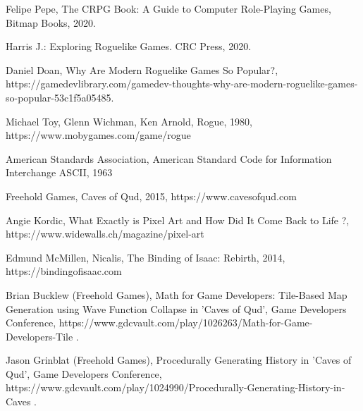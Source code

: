 \documentclass[12pt,twoside]{article}
\begin{document}

\begin{thebibliography}{4}
	

 Felipe Pepe, The CRPG Book: A Guide to Computer Role-Playing Games, Bitmap Books, 2020.

 Harris J.: Exploring Roguelike Games. CRC Press, 2020.

 Daniel Doan, Why Are Modern Roguelike Games So Popular?, https://gamedevlibrary.com/gamedev-thoughts-why-are-modern-roguelike-games-so-popular-53c1f5a05485.

 Michael Toy, Glenn Wichman, Ken Arnold, Rogue, 1980, https://www.mobygames.com/game/rogue

 American Standards Association, American Standard Code for Information Interchange ASCII, 1963

 Freehold Games, Caves of Qud, 2015, https://www.cavesofqud.com

 Angie Kordic, What Exactly is Pixel Art and How Did It Come Back to Life ?, https://www.widewalls.ch/magazine/pixel-art

 Edmund McMillen, Nicalis, The Binding of Isaac: Rebirth, 2014, https://bindingofisaac.com

 Brian Bucklew (Freehold Games), Math for Game Developers: Tile-Based Map Generation using Wave Function Collapse in 'Caves of Qud', Game Developers Conference, https://www.gdcvault.com/play/1026263/Math-for-Game-Developers-Tile .

 Jason Grinblat (Freehold Games), Procedurally Generating History in 'Caves of Qud', Game Developers Conference, https://www.gdcvault.com/play/1024990/Procedurally-Generating-History-in-Caves .


\end{thebibliography}
\end{document}
